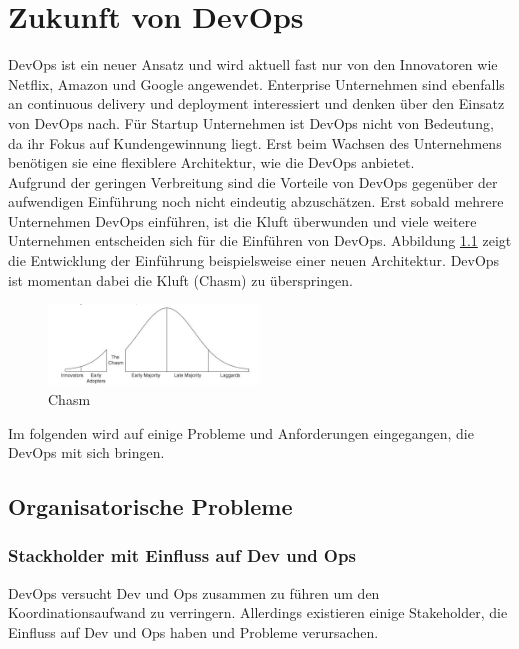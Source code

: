 \chapter{Zukunft von DevOps}

DevOps ist ein neuer Ansatz und wird aktuell fast nur von den Innovatoren wie Netflix, Amazon und Google angewendet. Enterprise Unternehmen sind ebenfalls an continuous delivery und deployment interessiert und denken über den Einsatz von DevOps nach. Für Startup Unternehmen ist DevOps nicht von Bedeutung, da ihr Fokus auf Kundengewinnung liegt. Erst beim Wachsen des Unternehmens benötigen sie eine flexiblere Architektur, wie die DevOps anbietet. \\
Aufgrund der geringen Verbreitung sind die Vorteile von DevOps gegenüber der aufwendigen Einführung noch nicht eindeutig abzuschätzen. Erst sobald mehrere Unternehmen DevOps einführen, ist die Kluft überwunden und viele weitere Unternehmen entscheiden sich für die Einführen von DevOps. Abbildung \ref{Chasm} zeigt die Entwicklung der Einführung beispielsweise einer neuen Architektur. DevOps ist momentan dabei die Kluft (Chasm) zu überspringen. 

\begin{figure}[htbp]
  \centering
  \includegraphics[width=0.5\textwidth]{pictures/chasm.png}
	\caption{Chasm}
	\label{Chasm}
\end{figure} 

Im folgenden wird auf einige Probleme und Anforderungen eingegangen, die DevOps mit sich bringen.

\section{Organisatorische Probleme}

\subsection{Stackholder mit Einfluss auf Dev und Ops}
DevOps versucht Dev und Ops zusammen zu führen um den Koordinationsaufwand zu verringern. Allerdings existieren einige Stakeholder, die Einfluss auf Dev und Ops haben und Probleme verursachen.\\

